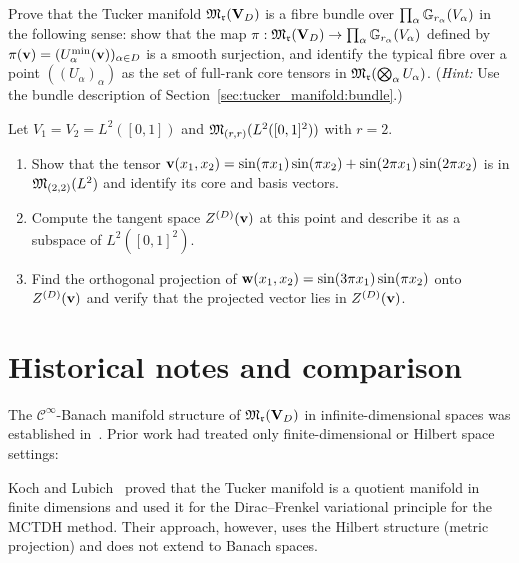 \begin{exercise}
Prove that the Tucker manifold $\mathfrak{M}_{\mathfrak{r}}(\mathbf{V}_D)$ is a fibre bundle
over $\prod_\alpha \mathbb{G}_{r_\alpha}(V_\alpha)$ in the following sense:
show that the map $\pi: \mathfrak{M}_{\mathfrak{r}}(\mathbf{V}_D) \to \prod_\alpha
\mathbb{G}_{r_\alpha}(V_\alpha)$ defined by $\pi(\mathbf{v}) =
(U^{\min}_{\alpha}(\mathbf{v}))_{\alpha \in D}$ is a smooth surjection, and
identify the typical fibre over a point $((U_\alpha)_\alpha)$ as the
set of full-rank core tensors in
$\mathfrak{M}_{\mathfrak{r}}(\bigotimes_\alpha U_\alpha)$.
(\emph{Hint:} Use the bundle description of
Section~\ref{sec:tucker_manifold:bundle}.)
\end{exercise}

\begin{exercise}
Let $V_1 = V_2 = L^2([0,1])$ and $\mathfrak{M}_{(r,r)}(L^2([0,1]^2))$ with
$r = 2$.
\begin{enumerate}
\item[\textup{(a)}] Show that the tensor $\mathbf{v}(x_1,x_2) = \sin(\pi x_1)
    \sin(\pi x_2) + \sin(2\pi x_1)\sin(2\pi x_2)$ is in
    $\mathfrak{M}_{(2,2)}(L^2)$ and identify its core and basis vectors.
\item[\textup{(b)}] Compute the tangent space $Z^{(D)}(\mathbf{v})$ at this point
    and describe it as a subspace of $L^2([0,1]^2)$.
\item[\textup{(c)}] Find the orthogonal projection of
    $\mathbf{w}(x_1,x_2) = \sin(3\pi x_1)\sin(\pi x_2)$ onto $Z^{(D)}(\mathbf{v})$
    and verify that the projected vector lies in $Z^{(D)}(\mathbf{v})$.
\end{enumerate}
\end{exercise}

\section{Historical notes and comparison}
\label{sec:tucker_manifold:history}

The $\mathcal{C}^\infty$-Banach manifold structure of
$\mathfrak{M}_{\mathfrak{r}}(\mathbf{V}_D)$ in infinite-dimensional spaces was established
in~\cite{FHN2019}. Prior work had treated only finite-dimensional or
Hilbert space settings:

Koch and Lubich~\cite{KochLubich2007} proved that the Tucker manifold
is a quotient manifold in finite dimensions and used it for the
Dirac--Frenkel variational principle for the MCTDH method. Their
approach, however, uses the Hilbert structure (metric projection)
and does not extend to Banach spaces.

